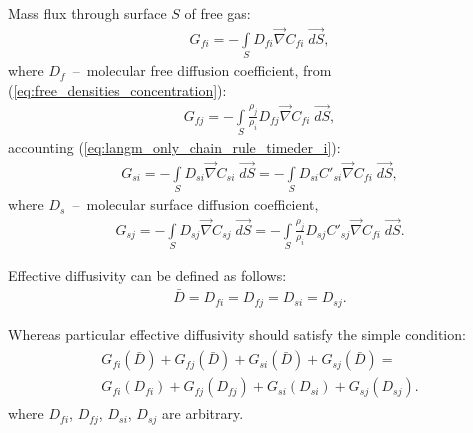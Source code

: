 \documentclass[a4paper,14pt,english]{extreport}
\begin{document}
Mass flux through surface $S$ of free gas:
\begin{eqnarray}
	\label{eq:flux_free_i}
	G_{fi} = - \int \limits_{S} D_{fi} \vec{\nabla}C_{fi} \; \vec{dS},
\end{eqnarray}
where $D_{f}$~--~molecular free diffusion coefficient, from (\ref{eq:free_densities_concentration}):
\begin{eqnarray}
	\label{eq:flux_free_j}
	G_{fj} = -\int \limits_{S} \frac{\rho_j}{\rho_i} D_{fj} \vec{\nabla}C_{fi} \; \vec{dS},
\end{eqnarray}
accounting (\ref{eq:langm_only_chain_rule_timeder_i}):
\begin{eqnarray}
	\label{eq:flux_surface_i}
	G_{si} = - \int \limits_{S} D_{si} \vec\nabla C_{si} \; \vec{dS} = - \int \limits_{S} D_{si}  C'_{si}\vec\nabla C_{fi} \; \vec{dS},
\end{eqnarray}
where $D_{s}$~--~molecular surface diffusion coefficient,
\begin{eqnarray}
	\label{eq:flux_surface_j}
	G_{sj} = - \int \limits_{S} D_{sj} \vec\nabla C_{sj} \; \vec{dS} = - \int \limits_{S} \frac{\rho_j}{\rho_i}D_{sj}  C'_{sj}\vec\nabla C_{fi} \; \vec{dS}.
\end{eqnarray}

Effective diffusivity can be defined as follows:
\begin{eqnarray}
	\label{eq:effective_diffusivity}
\bar{D} = D_{fi} =D_{fj} =D_{si} =D_{sj}.
\end{eqnarray}

Whereas particular effective diffusivity should satisfy the simple condition:
\begin{eqnarray}
	\begin{gathered}
	\label{eq:effective_diffusivity_condition}
	G_{fi}\left(\bar{D} \right) + G_{fj}\left(\bar{D} \right)  + G_{si}\left(\bar{D} \right)  + G_{sj}\left(\bar{D} \right) = \\
	G_{fi}\left(D_{fi} \right) + G_{fj}\left(D_{fj} \right)  + G_{si}\left(D_{si}\right)  + G_{sj}\left(D_{sj} \right).
	\end{gathered}
\end{eqnarray}
where $D_{fi}$, $D_{fj}$, $D_{si}$, $D_{sj}$ are arbitrary. 






 
\end{document}
